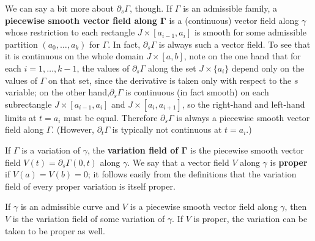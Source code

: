 We can say a bit more about $\partial_s\Gamma$, though. If $\Gamma$ is an admissible family, a \textbf{piecewise smooth vector field along $\bm{\Gamma}$} is a (continuous) 
vector field along $\gamma$ whose restriction to each rectangle $J\times[a_{i-1},a_i]$ is smooth for some admissible partition $(a_0,\dots,a_k)$ for $\Gamma$. In fact, 
$\partial_s\Gamma$ is always such a vector field. To see that it is continuous on the whole domain $J\times[a,b]$, note on the one hand that for each $i=1,\dots,k-1$, the 
values of $\partial_s\Gamma$ along the set $J\times\{a_i\}$ depend only on the values of $\Gamma$ on that set, since the derivative is taken only with respect to the 
$s$ variable; on the other hand,$\partial_s\Gamma$ is continuous (in fact smooth) on each subrectangle $J\times[a_{i-1},a_i]$ and $J\times[a_i,a_{i+1}]$, so the 
right-hand and left-hand limits at $t=a_i$ must be equal. Therefore $\partial_s\Gamma$ is always a piecewise smooth vector field along $\Gamma$. (However, 
$\partial_t\Gamma$ is typically not continuous at $t=a_i$.)\par
If $\Gamma$ is a variation of $\gamma$, the \textbf{variation field of $\bm{\Gamma}$} is the piecewise smooth vector field $V(t)=\partial_s\Gamma(0,t)$ along $\gamma$. 
We say that a vector field $V$ along $\gamma$ is \textbf{proper} if $V(a)=V(b)=0$; it follows easily from the definitions that the variation field of every proper 
variation is itself proper.
\begin{proposition}\label{Riemann variation field}
If $\gamma$ is an admissible curve and $V$ is a piecewise smooth vector field along $\gamma$, then $V$ is the variation field of some variation of $\gamma$. If $V$ is 
proper, the variation can be taken to be proper as well.
\end{proposition}
